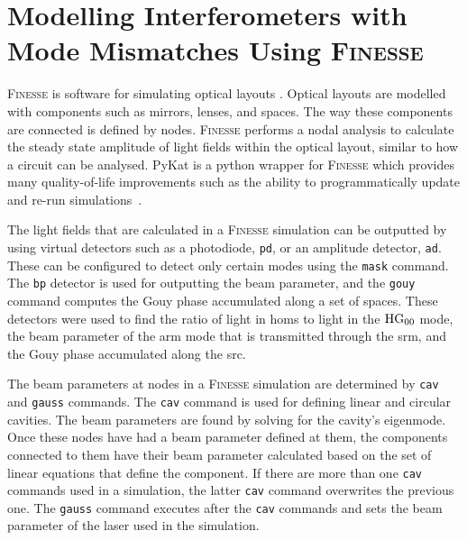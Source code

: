 \section{Modelling Interferometers with Mode Mismatches Using \textsc{Finesse}}
\label{sec:beam_parameter_chapter_finesse_1}
\textsc{Finesse} is software for simulating optical layouts \cite{Freise2004,finesse_manual}. Optical layouts are modelled with components such as mirrors, lenses, and spaces. The way these components are connected is defined by nodes. \textsc{Finesse} performs a nodal analysis to calculate the steady state amplitude of light fields within the optical layout, similar to how a circuit can be analysed. PyKat is a python wrapper for \textsc{Finesse} which provides many quality-of-life improvements such as the ability to programmatically update and re-run simulations~\cite{Pykat}.
\par
The light fields that are calculated in a \textsc{Finesse} simulation can be outputted by using virtual detectors such as a photodiode, \texttt{pd}, or an amplitude detector, \texttt{ad}. These can be configured to detect only certain modes using the \texttt{mask} command. The \texttt{bp} detector is used for outputting the beam parameter, and the \texttt{gouy} command computes the Gouy phase accumulated along a set of spaces. These detectors were used to find the ratio of light in \glspl{hom} to light in the $\rm{HG}_{00}$ mode, the beam parameter of the arm mode that is transmitted through the \gls{srm}, and the Gouy phase accumulated along the \gls{src}.
\par
The beam parameters at nodes in a \textsc{Finesse} simulation are determined by \texttt{cav} and \texttt{gauss} commands. The \texttt{cav} command is used for defining linear and circular cavities. The beam parameters are found by solving for the cavity's eigenmode. Once these nodes have had a beam parameter defined at them, the components connected to them have their beam parameter calculated based on the set of linear equations that define the component. If there are more than one \texttt{cav} commands used in a simulation, the latter \texttt{cav} command overwrites the previous one. The \texttt{gauss} command executes after the \texttt{cav} commands and sets the beam parameter of the laser used in the simulation. 
